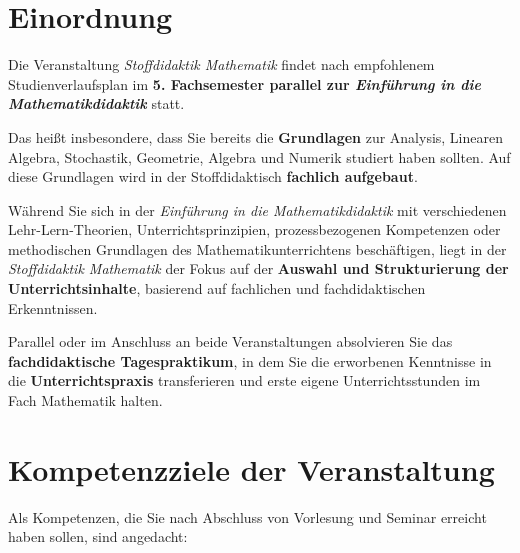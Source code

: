 \documentclass[
]{scrbook}
\theoremstyle{definition}
\theoremstyle{definition}
\theoremstyle{definition}
\theoremstyle{definition}
\theoremstyle{remark}
\begin{document}
\section*{Einordnung}\label{einordnung}

Die Veranstaltung \emph{Stoffdidaktik Mathematik} findet nach empfohlenem Studienverlaufsplan im \textbf{5. Fachsemester parallel zur \emph{Einführung in die Mathematikdidaktik}} statt.

Das heißt insbesondere, dass Sie bereits die \textbf{Grundlagen} zur Analysis, Linearen Algebra, Stochastik, Geometrie, Algebra und Numerik studiert haben sollten. Auf diese Grundlagen wird in der Stoffdidaktisch \textbf{fachlich aufgebaut}.

Während Sie sich in der \emph{Einführung in die Mathematikdidaktik} mit verschiedenen Lehr-Lern-Theorien, Unterrichtsprinzipien, prozessbezogenen Kompetenzen oder methodischen Grundlagen des Mathematikunterrichtens beschäftigen, liegt in der \emph{Stoffdidaktik Mathematik} der Fokus auf der \textbf{Auswahl und Strukturierung der Unterrichtsinhalte}, basierend auf fachlichen und fachdidaktischen Erkenntnissen.

Parallel oder im Anschluss an beide Veranstaltungen absolvieren Sie das \textbf{fachdidaktische Tagespraktikum}, in dem Sie die erworbenen Kenntnisse in die \textbf{Unterrichtspraxis} transferieren und erste eigene Unterrichtsstunden im Fach Mathematik halten.

\section*{Kompetenzziele der Veranstaltung}\label{kompetenzziele-der-veranstaltung}

Als Kompetenzen, die Sie nach Abschluss von Vorlesung und Seminar erreicht haben sollen, sind angedacht:
\end{document}
